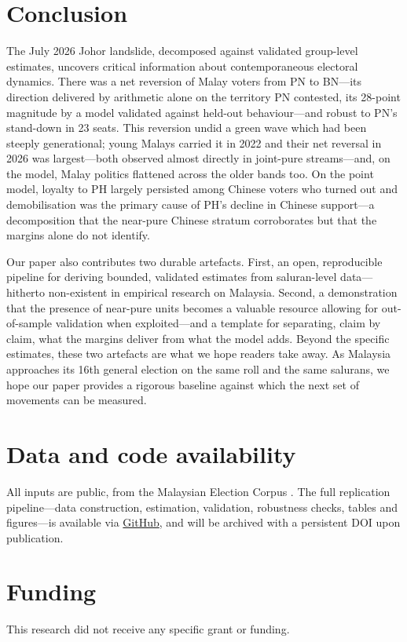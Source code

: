 \documentclass[11pt]{article}
\begin{document}
\section{Conclusion}
\label{sec:conclusion}

The July 2026 Johor landslide, decomposed against validated group-level estimates, uncovers critical information about contemporaneous electoral dynamics. There was a net reversion of Malay voters from PN to BN---its direction delivered by arithmetic alone on the territory PN contested, its 28-point magnitude by a model validated against held-out behaviour---and robust to PN's stand-down in 23 seats. This reversion undid a green wave which had been steeply generational; young Malays carried it in 2022 and their net reversal in 2026 was largest---both observed almost directly in joint-pure streams---and, on the model, Malay politics flattened across the older bands too. On the point model, loyalty to PH largely persisted among Chinese voters who turned out and demobilisation was the primary cause of PH's decline in Chinese support---a decomposition that the near-pure Chinese stratum corroborates but that the margins alone do not identify.

Our paper also contributes two durable artefacts. First, an open, reproducible pipeline for deriving bounded, validated estimates from saluran-level data---hitherto non-existent in empirical research on Malaysia. Second, a demonstration that the presence of near-pure units becomes a valuable resource allowing for out-of-sample validation when exploited---and a template for separating, claim by claim, what the margins deliver from what the model adds. Beyond the specific estimates, these two artefacts are what we hope readers take away. As Malaysia approaches its 16th general election on the same roll and the same salurans, we hope our paper provides a rigorous baseline against which the next set of movements can be measured.

\section*{Data and code availability}
All inputs are public, from the Malaysian Election Corpus \cite{meco1}. The full replication pipeline---data construction, estimation, validation, robustness checks, tables and figures---is available via \href{https://github.com/Thevesh/paper-saluran-jhr-se16}{GitHub}, and will be archived with a persistent DOI upon publication.

\section*{Funding}
This research did not receive any specific grant or funding.
\end{document}
